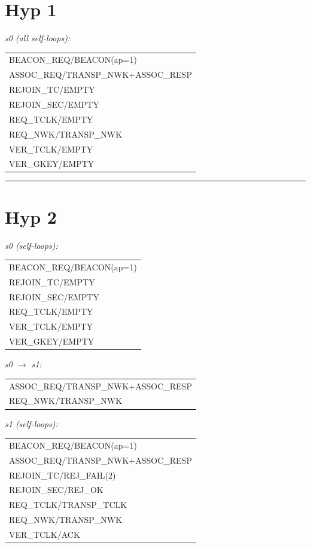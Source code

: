 \documentclass[10pt]{article}
\makeatletter
\newcommand{\iolist}[1]{%
  \ttfamily\small
  \begin{tabular}{@{}l@{}}
  #1
  \end{tabular}%
  \rmfamily
}
\makeatother
\begin{document}
\section*{Hyp 1}

\noindent\textit{s0 (all self-loops):}\\[2pt]
\iolist{%
BEACON\_REQ/BEACON(ap=1)\\
ASSOC\_REQ/TRANSP\_NWK+ASSOC\_RESP\\
REJOIN\_TC/EMPTY\\
REJOIN\_SEC/EMPTY\\
REQ\_TCLK/EMPTY\\
REQ\_NWK/TRANSP\_NWK\\
VER\_TCLK/EMPTY\\
VER\_GKEY/EMPTY\\
}

\bigskip\hrule

\section*{Hyp 2}

\noindent\textit{s0 (self-loops):}\\[2pt]
\iolist{%
BEACON\_REQ/BEACON(ap=1)\\
REJOIN\_TC/EMPTY\\
REJOIN\_SEC/EMPTY\\
REQ\_TCLK/EMPTY\\
VER\_TCLK/EMPTY\\
VER\_GKEY/EMPTY\\
}

\medskip
\noindent\textit{s0 $\to$ s1:}\\[2pt]
\iolist{%
ASSOC\_REQ/TRANSP\_NWK+ASSOC\_RESP\\
REQ\_NWK/TRANSP\_NWK\\
}

\medskip
\noindent\textit{s1 (self-loops):}\\[2pt]
\iolist{%
BEACON\_REQ/BEACON(ap=1)\\
ASSOC\_REQ/TRANSP\_NWK+ASSOC\_RESP\\
REJOIN\_TC/REJ\_FAIL(2)\\
REJOIN\_SEC/REJ\_OK\\
REQ\_TCLK/TRANSP\_TCLK\\
REQ\_NWK/TRANSP\_NWK\\
VER\_TCLK/ACK\\
}
\end{document}

